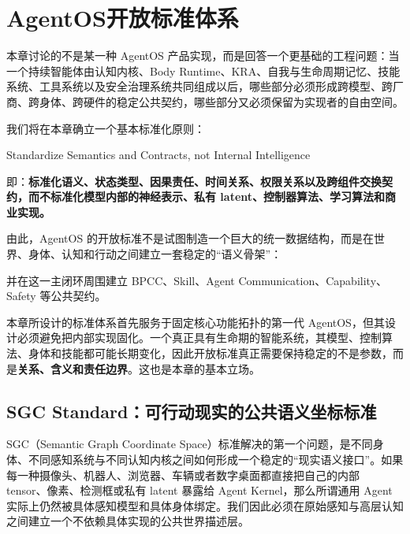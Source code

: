 \chapter{AgentOS开放标准体系}
\label{chap:agentos-open-standards}

\begin{chapterlead}
本章讨论的不是某一种 AgentOS 产品实现，而是回答一个更基础的工程问题：当一个持续智能体由认知内核、Body Runtime、KRA、自我与生命周期记忆、技能系统、工具系统以及安全治理系统共同组成以后，哪些部分必须形成跨模型、跨厂商、跨身体、跨硬件的稳定公共契约，哪些部分又必须保留为实现者的自由空间。

我们将在本章确立一个基本标准化原则：

\begin{statementbox}
Standardize Semantics and Contracts,
not Internal Intelligence
\end{statementbox}

即：\textbf{标准化语义、状态类型、因果责任、时间关系、权限关系以及跨组件交换契约，而不标准化模型内部的神经表示、私有 latent、控制器算法、学习算法和商业实现。}

由此，AgentOS 的开放标准不是试图制造一个巨大的统一数据结构，而是在世界、身体、认知和行动之间建立一套稳定的``语义骨架''：

\begin{statementbox}
\centering
{}
\end{statementbox}

并在这一主闭环周围建立 BPCC、Skill、Agent Communication、Capability、Safety 等公共契约。

本章所设计的标准体系首先服务于固定核心功能拓扑的第一代 AgentOS，但其设计必须避免把内部实现固化。一个真正具有生命期的智能系统，其模型、控制算法、身体和技能都可能长期变化，因此开放标准真正需要保持稳定的不是参数，而是\textbf{关系、含义和责任边界}。这也是本章的基本立场。
\end{chapterlead}


\section{SGC Standard：可行动现实的公共语义坐标标准}

SGC（Semantic Graph Coordinate Space）标准解决的第一个问题，是不同身体、不同感知系统与不同认知内核之间如何形成一个稳定的``现实语义接口''。如果每一种摄像头、机器人、浏览器、车辆或者数字桌面都直接把自己的内部 tensor、像素、检测框或私有 latent 暴露给 Agent Kernel，那么所谓通用 Agent 实际上仍然被具体感知模型和具体身体绑定。我们因此必须在原始感知与高层认知之间建立一个不依赖具体实现的公共世界描述层。

